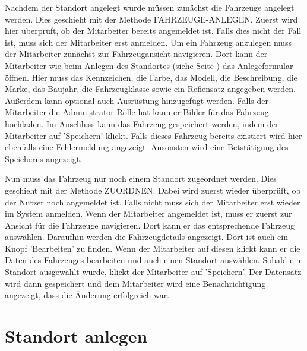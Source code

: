 

Nachdem der Standort angelegt wurde müssen zunächst die Fahrzeuge angelegt werden. Dies geschieht mit der Methode FAHRZEUGE-ANLEGEN. Zuerst wird hier überprüft, ob der Mitarbeiter bereits angemeldet ist. Falls dies nicht der Fall ist, muss sich der Mitarbeiter erst anmelden. Um ein Fahrzeug anzulegen muss der Mitarbeiter zunächst zur Fahrzeugansicht navigieren. Dort kann der Mitarbeiter wie beim Anlegen des Standortes (siehe Seite \pageref{code:StandortAnlegen}) das Anlegeformular öffnen. Hier muss das Kennzeichen, die Farbe, das Modell, die Beschreibung, die Marke, das Baujahr, die Fahrzeugklasse sowie ein Refiensatz angegeben werden. Außerdem kann optional auch Ausrüstung hinzugefügt werden. Falls der Mitarbeiter die Administrator-Rolle hat kann er Bilder für das Fahrzeug hochladen. Im Anschluss kann das Fahrzeug gespeichert werden, indem der Mitarbeiter auf 'Speichern' klickt. Falls dieses Fahrzeug bereits existiert wird hier ebenfalls eine Fehlermeldung angezeigt. Ansonsten wird eine Betstätigung des Speicherns angezeigt.



Nun muss das Fahrzeug nur noch einem Standort zugeordnet werden. Dies geschieht mit der Methode ZUORDNEN. Dabei wird zuerst wieder überprüft, ob der Nutzer noch angemeldet ist. Falls nicht muss sich der Mitarbeiter erst wieder im System anmelden. Wenn der Mitarbeiter angemeldet ist, muss er zuerst zur Ansicht für die Fahrzeuge navigieren. Dort kann er das entsprechende Fahrzeug auswählen. Daraufhin werden die Fahrzeugdetails angezeigt. Dort ist auch ein Knopf 'Bearbeiten' zu finden. Wenn der Mitarbeiter auf diesen klickt kann er die Daten des Fahrzeuges bearbeiten und auch einen Standort auswählen. Sobald ein Standort ausgewählt wurde, klickt der Mitarbeiter auf 'Speichern'. Der Datensatz wird dann gespeichert und dem Mitarbeiter wird eine Benachrichtigung angezeigt, dass die Änderung erfolgreich war.


\newpage

\section{Standort anlegen}

